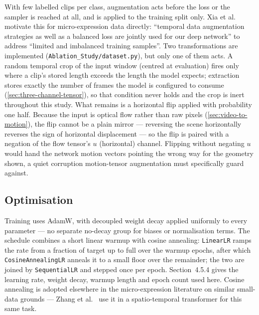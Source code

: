With few labelled clips per class, augmentation acts before the loss or the sampler is reached at all, and is applied to the training split only. Xia et al.~\cite{xia2020a} motivate this for micro-expression data directly: ``temporal data augmentation strategies as well as a balanced loss are jointly used for our deep network'' to address ``limited and imbalanced training samples''. Two transformations are implemented (\texttt{Ablation\_Study/dataset.py}), but only one of them acts. A random temporal crop of the input window (centred at evaluation) fires only where a clip's stored length exceeds the length the model expects; extraction stores exactly the number of frames the model is configured to consume (\autoref{sec:three-channel-tensor}), so that condition never holds and the crop is inert throughout this study. What remains is a horizontal flip applied with probability one half. Because the input is optical flow rather than raw pixels (\autoref{sec:video-to-motion}), the flip cannot be a plain mirror --- reversing the scene horizontally reverses the sign of horizontal displacement --- so the flip is paired with a negation of the flow tensor's $u$ (horizontal) channel. Flipping without negating $u$ would hand the network motion vectors pointing the wrong way for the geometry shown, a quiet corruption motion-tensor augmentation must specifically guard against.

\subsection{Optimisation}
\label{sec:optimisation}

Training uses AdamW, with decoupled weight decay applied uniformly to every parameter --- no separate no-decay group for biases or normalisation terms. The schedule combines a short linear warmup with cosine annealing: \texttt{LinearLR} ramps the rate from a fraction of target up to full over the warmup epochs, after which \texttt{CosineAnnealingLR} anneals it to a small floor over the remainder; the two are joined by \texttt{SequentialLR} and stepped once per epoch. Section~4.5.4 gives the learning rate, weight decay, warmup length and epoch count used here. Cosine annealing is adopted elsewhere in the micro-expression literature on similar small-data grounds --- Zhang et al.~\cite{zhang2022} use it in a spatio-temporal transformer for this same task.

